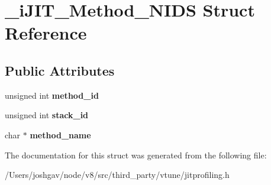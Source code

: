 \hypertarget{struct__i_j_i_t___method___n_i_d_s}{}\section{\+\_\+i\+J\+I\+T\+\_\+\+Method\+\_\+\+N\+I\+DS Struct Reference}
\label{struct__i_j_i_t___method___n_i_d_s}
\subsection*{Public Attributes}
\begin{DoxyCompactItemize}
\item 
unsigned int {\bfseries method\+\_\+id}\hypertarget{struct__i_j_i_t___method___n_i_d_s_a2caee5236406e074bf7d263f9e251063}{}\label{struct__i_j_i_t___method___n_i_d_s_a2caee5236406e074bf7d263f9e251063}

\item 
unsigned int {\bfseries stack\+\_\+id}\hypertarget{struct__i_j_i_t___method___n_i_d_s_a990611a5e75c807c519089de8bbe3757}{}\label{struct__i_j_i_t___method___n_i_d_s_a990611a5e75c807c519089de8bbe3757}

\item 
char $\ast$ {\bfseries method\+\_\+name}\hypertarget{struct__i_j_i_t___method___n_i_d_s_ae1fa90351a5f2b0b32f1ab25600d07fc}{}\label{struct__i_j_i_t___method___n_i_d_s_ae1fa90351a5f2b0b32f1ab25600d07fc}

\end{DoxyCompactItemize}


The documentation for this struct was generated from the following file\+:\begin{DoxyCompactItemize}
\item 
/\+Users/joshgav/node/v8/src/third\+\_\+party/vtune/jitprofiling.\+h\end{DoxyCompactItemize}
